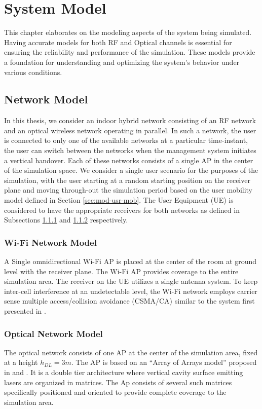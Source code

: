 \chapter{System Model}
\label{chp:system-model}
This chapter elaborates on the modeling aspects of the system being simulated. Having accurate models for both RF and Optical channels is essential for ensuring the reliability and performance of the simulation. These models provide a foundation for understanding and optimizing the system's behavior under various conditions.
\section{Network Model}
\label{sec:mod-ntw}
In this thesis, we consider an indoor hybrid network consisting of an RF network and an optical wireless network operating in parallel. In such a network, the user is connected to only one of the available networks at a particular time-instant, the user can switch between the networks when the management system initiates a vertical handover. Each of these networks consists of a single AP in the center of the simulation space. We consider a single user scenario for the purposes of the simulation, with the user starting at a random starting position on the receiver plane and moving through-out the simulation period based on the user mobility model defined in Section \ref{sec:mod-usr-mob}. The User Equipment (UE) is considered to have the appropriate receivers for both networks as defined in  Subsections \ref{subsec:mod-ntw-rf} and \ref{subsec:mod-ntw-optical} respectively.
\subsection{Wi-Fi Network Model}
\label{subsec:mod-ntw-rf}
A Single omnidirectional Wi-Fi AP is placed at the center of the room at ground level with the receiver plane. The Wi-Fi AP provides coverage to the entire simulation area. The receiver on the UE utilizes a single antenna system. To keep inter-cell interference at an undetectable level, the Wi-Fi network employs carrier sense multiple access/collision avoidance (CSMA/CA) similar to the system first presented in \cite{wu_novel_2020-1}. 
\subsection{Optical Network Model}
\label{subsec:mod-ntw-optical}
The optical network consists of one AP at the center of the simulation area, fixed at a height $h_{DL}=3m$. The AP is based on an “Array of Arrays model” proposed in \cite{sarbazi_tbs_2020} and \cite{kazemi_novel_2024}. It is a double tier architecture where vertical cavity surface emitting lasers are organized in matrices. The Ap consists of several such matrices specifically positioned and oriented to provide complete coverage to the simulation area.


